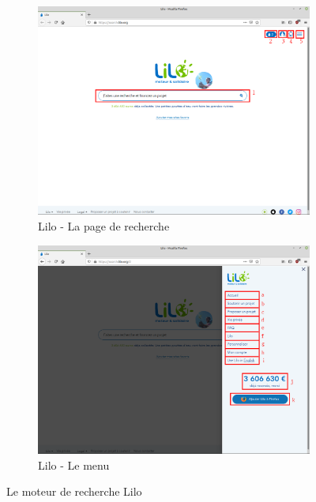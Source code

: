 \documentclass[12pt]{book}
\begin{document}
		\begin{figure}[h]
			\begin{subfigure}{.5\textwidth}
				\centering
				\includegraphics[width=\textwidth]{include/lilo.png}
				\caption{Lilo - La page de recherche}
			\end{subfigure}
			\begin{subfigure}{.5\textwidth}
				\centering
				\includegraphics[width=\textwidth]{include/lilo_menu.png}
				\caption{Lilo - Le menu}
			\end{subfigure}
			\caption{Le moteur de recherche Lilo}
			\label{fig:lilo}
		\end{figure}
\end{document}
